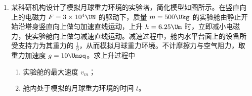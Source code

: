 \documentclass[\gkver]{gaokaozhenti}
\begin{document}
\begin{enumerate}
{（3）根据题图可知测量值明显偏离拟合直线，电容的测量值偏小，根据 $C=\frac{\varepsilon_{r}S}{4\pi kd}$ 可知出现的原因是塑料板没有压紧或正对面积取值偏大。

（4）根据平行板电容公式 $C=\frac{\varepsilon_{r}S}{4\pi kd}$。

对 $C-\frac{d_{0}}{d}$ 图线有
\[ C=\frac{\varepsilon_{\mathrm{r}}S_{0}}{4\pi kd}=\frac{\varepsilon_{\mathrm{r}}S_{0}}{4\pi kd_{0}}\cdot\frac{d_{0}}{d} \]
对 $C-\frac{S}{S_{0}}$ 图线有
\[ C=\frac{\varepsilon_{\mathrm{r}}S}{4\pi k\cdot20d_{0}}=\frac{\varepsilon_{\mathrm{r}}S_{0}}{4\pi k\cdot20d_{0}}\cdot\frac{S}{S_{0}} \]
则 $k_{1}=\frac{\varepsilon_{\mathrm{r}}S_{0}}{4\pi kd_{0}}$，$k_{2}=\frac{\varepsilon_{\mathrm{r}}S_{0}}{4\pi k\cdot20d_{0}}$，可得 $\frac{k_{1}}{k_{2}}=20$。
}
\item
某科研机构设计了模拟月球重力环境的实验塔，简化模型如图所示。在竖直向上的电磁力 $F=3\times10^{4}\UN$ 的驱动下，质量 $m=500\Ukg$ 的实验舱由静止开始沿塔身竖直向上做匀加速直线运动，上升 $h=6.25\Um$ 时，立即减小电磁力，使实验舱向上做匀减速直线运动。减速过程中，舱内水平台面上的设备所受支持力为其重力的 $\frac{1}{6}$，从而模拟月球重力环境。不计摩擦力与空气阻力，取重力加速度 $g=10\Umsq$。求上升过程中
\begin{enumerate}
	\item
	实验舱的最大速度 $v_{m}$；
	\item
	舱内处于模拟的月球重力环境的时间 $t$。
\end{enumerate}
\onepicture[align=right, h=5.58cm]{}

\end{enumerate}
\end{document}
